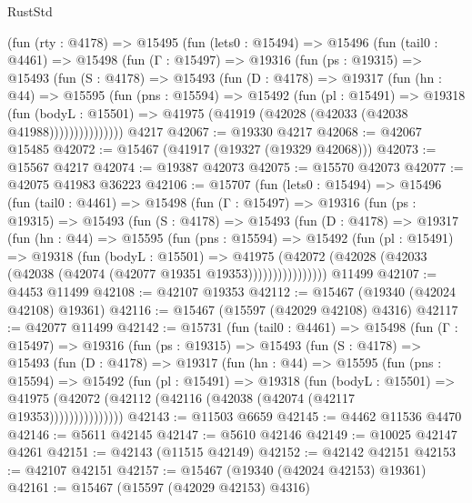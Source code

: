 \begin{lexlean}{RustStd}
\begin{coremodule}
    (fun (rty : @4178) =>
    @15495
      (fun (lets0 : @15494) =>
      @15496
        (fun (tail0 : @4461) =>
        @15498
          (fun (Γ : @15497) =>
          @19316
            (fun (ps : @19315) =>
            @15493
              (fun (S : @4178) =>
              @15493
                (fun (D : @4178) =>
                @19317
                  (fun (hn : @44) =>
                  @15595
                    (fun (pns : @15594) =>
                    @15492
                      (fun (pl : @15491) =>
                      @19318
                        (fun (bodyL : @15501) =>
                        @41975 (@41919 (@42028 (@42033 (@42038 @41988)))))))))))))))
    @4217
@42067 := @19330 @4217
@42068 := @42067 @15485
@42072 := @15467 (@41917 (@19327 (@19329 @42068)))
@42073 := @15567 @4217
@42074 := @19387 @42073
@42075 := @15570 @42073
@42077 := @42075 @41983 @36223
@42106 := @15707
    (fun (lets0 : @15494) =>
    @15496
      (fun (tail0 : @4461) =>
      @15498
        (fun (Γ : @15497) =>
        @19316
          (fun (ps : @19315) =>
          @15493
            (fun (S : @4178) =>
            @15493
              (fun (D : @4178) =>
              @19317
                (fun (hn : @44) =>
                @15595
                  (fun (pns : @15594) =>
                  @15492
                    (fun (pl : @15491) =>
                    @19318
                      (fun (bodyL : @15501) =>
                      @41975
                        (@42072
                          (@42028 (@42033 (@42038 (@42074 (@42077 @19351 @19353))))))))))))))))
    @11499
@42107 := @4453 @11499
@42108 := @42107 @19353
@42112 := @15467 (@19340 (@42024 @42108) @19361)
@42116 := @15467 (@15597 (@42029 @42108) @4316)
@42117 := @42077 @11499
@42142 := @15731
    (fun (tail0 : @4461) =>
    @15498
      (fun (Γ : @15497) =>
      @19316
        (fun (ps : @19315) =>
        @15493
          (fun (S : @4178) =>
          @15493
            (fun (D : @4178) =>
            @19317
              (fun (hn : @44) =>
              @15595
                (fun (pns : @15594) =>
                @15492
                  (fun (pl : @15491) =>
                  @19318
                    (fun (bodyL : @15501) =>
                    @41975 (@42072 (@42112 (@42116 (@42038 (@42074 (@42117 @19353)))))))))))))))
@42143 := @11503 @6659
@42145 := @4462 @11536 @4470
@42146 := @5611 @42145
@42147 := @5610 @42146
@42149 := @10025 @42147 @4261
@42151 := @42143 (@11515 @42149)
@42152 := @42142 @42151
@42153 := @42107 @42151
@42157 := @15467 (@19340 (@42024 @42153) @19361)
@42161 := @15467 (@15597 (@42029 @42153) @4316)

\end{coremodule}
\end{lexlean}
